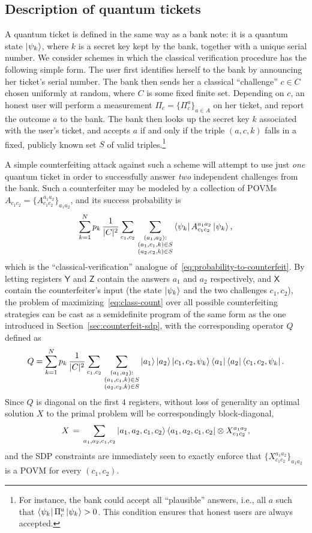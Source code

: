 \documentclass[11pt,letterpaper]{article}
\theoremstyle{definition}
\newcommand{\microspace}{\mspace{0.5mu}}
\def\({\left(}
\def \lket {\left|}
\def \rket {\right\rangle}
\def \lbra {\left\langle}
\def \rbra {\right|}
\newcommand{\ket}[1]{\lket\microspace #1 \microspace\rket}
\newcommand{\bra}[1]{\lbra\microspace #1 \microspace\rbra}
\newcommand{\reg}[1]{\mathsf{#1}}
\begin{document}
\subsection{Description of quantum tickets}\label{sec:class-tickets}

A quantum ticket is defined in the same way as a bank note: it is a
quantum state $\ket{\psi_k}$, where $k$ is a secret key kept by the
bank, together with a unique serial number. 
We consider schemes
in which the classical verification procedure has the following simple
form. The user first identifies herself to the bank by announcing her
ticket's serial number. The bank then sends her a classical
``challenge'' $c\in C$ chosen uniformly at random, where $C$ is some
fixed finite set. Depending on $c$, an honest user will perform a
measurement $\Pi_c = \{\Pi_c^a\}_{a\in A}$ on her ticket, and report
the outcome $a$ to the bank. The bank then looks up the secret key $k$
associated with the user's ticket, and accepts $a$ if and only if the
triple $(a,c,k)$ falls in a fixed, publicly known set $S$ of valid
triples.\footnote{For instance, the bank could accept all
  ``plausible'' answers, i.e., all $a$ such that
  $\bra{\psi_k}\Pi_c^a\ket{\psi_k} >0$. This condition ensures that
  honest users are always accepted.} 

A simple counterfeiting attack against such a scheme will attempt to
use just \emph{one} quantum ticket in order to successfully answer
\emph{two} independent challenges from the bank. Such a counterfeiter
may be modeled by a collection of POVMs $A_{c_1c_2} =
\{A_{c_1c_2}^{a_1a_2}\}_{a_1a_2}$, and its success probability is
\begin{equation}\label{eq:class-count}
  \sum_{k=1}^N p_k\, \frac{1}{|C|^2}\sum_{c_1,c_2} \,
  \sum_{\substack{(a_1,a_2):\\(a_1,c_1,k)\in S\\(a_2,c_2,k)\in S}} 
  \bra{\psi_k} A_{c_1 c_2}^{a_1 a_2} \ket{\psi_k},
\end{equation}
which is the ``classical-verification'' analogue
of~\eqref{eq:probability-to-counterfeit}.
By letting registers $\reg{Y}$ and
$\reg{Z}$ contain the answers $a_1$ and $a_2$ respectively, and
$\reg{X}$ contain the counterfeiter's input (the state $\ket{\psi_k}$
and the two challenges $c_1,c_2$), the problem of
maximizing~\eqref{eq:class-count} over all possible counterfeiting
strategies can be cast as a semidefinite program of the same form as
the one introduced in Section~\ref{sec:counterfeit-sdp}, with the
corresponding operator $Q$ defined as
$$ Q = \sum_{k=1}^N p_k\, \frac{1}{|C|^2} \sum_{c_1,c_2}
\,\sum_{\substack{(a_1,a_2):\\(a_1,c_1,k)\in S\\(a_2,c_2,k)\in S}}
\ket{a_1}\ket{a_2}\ket{c_1,c_2,\psi_k}
\bra{a_1}\bra{a_2}\bra{c_1,c_2,\psi_k}.$$ 
Since $Q$ is diagonal on the first $4$ registers, without
loss of generality an optimal solution $X$ to the primal problem will
be correspondingly block-diagonal, 
$$X \,=\, \sum_{a_1,a_2,c_1,c_2}
\ket{a_1,a_2,c_1,c_2}\bra{a_1,a_2,c_1,c_2} \otimes
X_{c_1c_2}^{a_1a_2},$$
and the SDP constraints are immediately seen to exactly enforce that
$\{X_{c_1c_2}^{a_1a_2}\}_{a_1a_2}$ is a POVM for every $(c_1,c_2)$.
\end{document}
